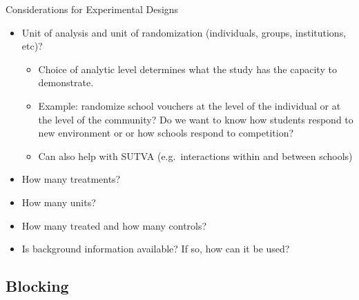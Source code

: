\documentclass{beamer}
\numberwithin{equation}{section}
\begin{document}
\begin{frame}{Considerations for Experimental Designs}
\begin{itemize}
\itemsep1pt\parskip0pt
\item
  Unit of analysis and unit of randomization (individuals, groups,
  institutions, etc)?

  \begin{itemize}
  \itemsep1pt\parskip0pt
  \item
    Choice of analytic level determines what the study has the capacity
    to demonstrate.
  \item
    Example: randomize school vouchers at the level of the individual or
    at the level of the community? Do we want to know how students respond
    to new environment or or how schools respond to competition?
  \item
    Can also help with SUTVA (e.g.~interactions within and between
    schools) \pause
  \end{itemize}
\item
  How many treatments?
\item
  How many units?
\item
  How many treated and how many controls?
\item
  Is background information available? If so, how can it be used?
\end{itemize}

\end{frame}

\subsection{Blocking}
\end{document}
